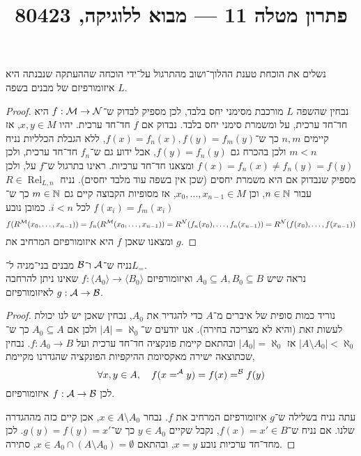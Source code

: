 
\title{פתרון מטלה 11 --- מבוא ללוגיקה, 80423}


\maketitle
\maketitleprint{}

\question{}
\subquestion{}
נשלים את הוכחת טענת ההלוך־ושוב מהתרגול על־ידי הוכחה שההעתקה שנבנתה היא איזומורפיזם של מבנים בשפה $L$.
\begin{proof}
	נבחין שהשפה $L$ מורכבת מסימני יחס בלבד, לכן מספיק לבדוק ש־$f : \mathcal{M} \to \mathcal{N}$ היא חד־חד ערכית, על ומשמרת סימני יחס בלבד.
	נבדוק אם $f$ חד־חד ערכית.
	יהיו $x, y \in M$, אז קיימים $n, m$ כך ש־$f(x) = f_n(x), f(y) = f_m(y)$, ללא הגבלת הכלליות נניח $m < n$ ולכן בהכרח גם $f(y) = f_n(y)$, אבל ידוע גם ש־$f_n$ חד־חד ערכית, ולכן $f(x) = f_n(x) \ne f_n(y) = f(y)$ ומצאנו חד־חד ערכיות.
	ראינו בתרגול ש־$f$ על, ולכן מספיק שנבדוק אם היא משמרת יחסים (שכן אין בשפה עוד מלבד יחסים).
	נניח $R \in \operatorname{Rel}_{L, n}$ עבור $n \in \mathbb{N}$, וכן $x_0, \dots, x_{n - 1} \in M$, אז מסופיות הקבוצה קיים גם $m \in \mathbb{N}$ כך ש־$f(x_i) = f_m(x_i)$ לכל $i < n$.
	כמובן נובע
	\[
		f(R^{\mathcal{M}}(x_0, \dots, x_{n - 1}))
		= f_n(R^{\mathcal{M}}(x_0, \dots, x_{n - 1}))
		= R^{\mathcal{N}}(f_n(x_0), \dots, f_n(x_{n - 1}))
		= R^{\mathcal{N}}(f(x_0), \dots, f(x_{n - 1}))
	\]
	ומצאנו שאכן $f$ היא איזומורפיזם המרחיב את $g$.
\end{proof}

\subquestion{}
נניח ש־$\mathcal{A}$ ו־$\mathcal{B}$ מבנים בני־מניה ל־$L_=$. \\
נראה שיש $A_0 \subseteq A, B_0 \subseteq B$ ואיזומורפיזם $f : \langle A_0 \rangle \to \langle B_0 \rangle$ שאינו ניתן להרחבה לאיזומורפיזם $g : \mathcal{A} \to \mathcal{B}$.
\begin{proof}
	נוריד כמות סופית של איברים מ־$A$ כדי להגדיר את $A_0$, נבחין שאכן יש לנו יכולת לעשות זאת (והיא לא מצריכה בחירה).
	אנו יודעים ש־$|A| = \aleph_0$ ולכן אם $A_0 \subseteq A$ כך ש־$|A \setminus A_0| < \aleph_0$ אז $|A_0| = \aleph_0$ ובהתאם קיימת פונקציה חד־חד ערכית ועל $f : A_0 \to B$.
	נבחין שכתוצאה ישירה מאקסיומת ההיקפיות הפונקציה שהגדרנו מקיימת,
	\[
		\forall x, y \in A,
		\quad
		f(x =^{\mathcal{A}} y)
		= f(x) =^{\mathcal{B}} f(y)
	\]
	לכן $f : \mathcal{A} \to \mathcal{B}$ איזומורפיזם.

	עתה נניח בשלילה ש־$g$ איזומורפיזם המרחיב את $f$.
	נבחר $x \in A \setminus A_0$, אכן קיים כזה מההגדרה שלנו.
	אם נניח ש־$f(x) = x' \in B$, נקבל שקיים $y \in A_0$ כך ש־$g(y) = f(y) = x'$.
	לכן מחד־חד ערכיות נובע $x = y$, ובהתאם $x \in A_0 \cap (A \setminus A_0) = \emptyset$, סתירה.
\end{proof}

